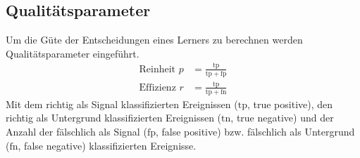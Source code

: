 
\subsection{Qualitätsparameter}
\label{sec:quali}
Um die Güte der Entscheidungen eines Lerners zu berechnen werden Qualitätsparameter eingeführt.
\begin{align}
    \textrm{Reinheit  } p &= \frac{\mathrm{tp}}{\mathrm{tp}+\mathrm{fp}} \\
    \textrm{Effizienz  } r &= \frac{\mathrm{tp}}{\mathrm{tp}+\mathrm{fn}}
\end{align}
Mit dem richtig als Signal klassifizierten Ereignissen ($\mathrm{tp}$, true positive), den richtig als Untergrund klassifizierten Ereignissen ($\mathrm{tn}$, true negative) und der Anzahl der fälschlich als Signal ($\mathrm{fp}$, false positive) bzw. fälschlich als Untergrund ($\mathrm{fn}$, false negative) klassifizierten Ereignisse.






